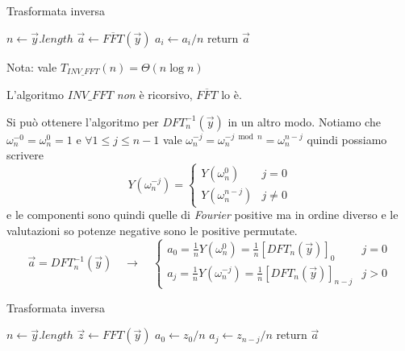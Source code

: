 \begin{algorithm}[H]
\caption{Trasformata inversa}\label{alg:invfft}
\begin{algorithmic}[1]
        \State $n \gets \vec{y}.length$
        \State $\vec{a} \gets \overline{FFT} \left( \vec{y} \right)$
            \State $a_i \gets a_i / n$
        \EndFor
        \State return $\vec{a}$
    \EndProcedure
\end{algorithmic}
\end{algorithm}

Nota: vale $T_{INV\_FFT}(n) = \Theta \left( n \log n \right)$

L'algoritmo $INV\_FFT$ \emph{non} è ricorsivo, $\overline{FFT}$ lo è.

Si può ottenere l'algoritmo per $DFT_n^{-1} \left( \vec{y} \right)$ in un altro modo. Notiamo che 
$\omega_n^{-0} = \omega_n^{0} = 1$ e $\forall 1 \leq j \leq n-1$ vale
$\omega_n^{-j} = \omega_n^{-j \bmod n} = \omega_n^{n-j}$
quindi possiamo scrivere
\begin{equation*}
    Y \left( \omega_n^{-j} \right) =
        \begin{cases}
            Y\left( \omega_n^{0} \right) & j=0 \\
            Y \left( \omega_n^{n-j} \right) & j \neq 0
        \end{cases}
\end{equation*}
e le componenti sono quindi quelle di \textit{Fourier} positive ma in ordine diverso e le valutazioni so potenze negative sono le positive permutate.
\begin{equation*}
    \vec{a} = DFT_n^{-1} \left( \vec{y} \right) \quad \rightarrow \quad
    \begin{cases}
        a_0 = \frac{1}{n} Y\left( \omega_n^{0} \right) = 
        \frac{1}{n} \left[ DFT_n \left( \vec{y} \right) \right]_0
        & j=0
        \\
        a_j = \frac{1}{n} Y\left( \omega_n^{-j} \right) = 
        \frac{1}{n} \left[ DFT_n \left( \vec{y} \right) \right]_{n-j}
        & j>0
    \end{cases}
\end{equation*}

\begin{algorithm}[H]
\caption{Trasformata inversa}\label{alg:invfftbis}
\begin{algorithmic}[1]
        \State $n \gets \vec{y}.length$
        \State $\vec{z} \gets FFT \left( \vec{y} \right)$
        \State $a_0 \gets z_0 / n$
            \State $a_j \gets z_{n-j} / n $
        \EndFor
        \State return $\vec{a}$
    \EndProcedure
\end{algorithmic}
\end{algorithm}


